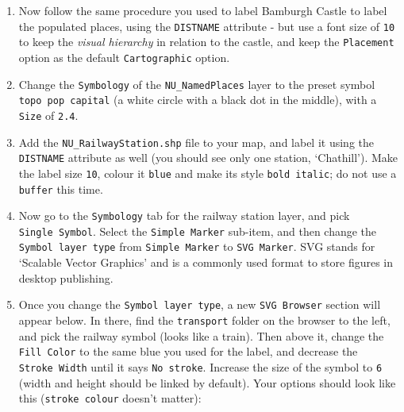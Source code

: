 \documentclass[
  letterpaper,
  DIV=11,
  numbers=noendperiod]{scrreprt}
\begin{document}
\begin{enumerate}
\def\labelenumi{(\arabic{enumi})}
\setcounter{enumi}{232}
\item
  Now follow the same procedure you used to label Bamburgh Castle to
  label the populated places, using the \texttt{DISTNAME} attribute -
  but use a font size of \texttt{10} to keep the \emph{visual hierarchy}
  in relation to the castle, and keep the \texttt{Placement} option as
  the default \texttt{Cartographic} option.
\item
  Change the \texttt{Symbology} of the \texttt{NU\_NamedPlaces} layer to
  the preset symbol \texttt{topo\ pop\ capital} (a white circle with a
  black dot in the middle), with a \texttt{Size} of \texttt{2.4}.
\item
  Add the \texttt{NU\_RailwayStation.shp} file to your map, and label it
  using the \texttt{DISTNAME} attribute as well (you should see only one
  station, `Chathill'). Make the label size \texttt{10}, colour it
  \texttt{blue} and make its style \texttt{bold\ italic}; do not use a
  \texttt{buffer} this time.
\item
  Now go to the \texttt{Symbology} tab for the railway station layer,
  and pick \texttt{Single\ Symbol}. Select the \texttt{Simple\ Marker}
  sub-item, and then change the \texttt{Symbol\ layer\ type} from
  \texttt{Simple\ Marker} to \texttt{SVG\ Marker}. SVG stands for
  `Scalable Vector Graphics' and is a commonly used format to store
  figures in desktop publishing.
\item
  Once you change the \texttt{Symbol\ layer\ type}, a new
  \texttt{SVG\ Browser} section will appear below. In there, find the
  \texttt{transport} folder on the browser to the left, and pick the
  railway symbol (looks like a train). Then above it, change the
  \texttt{Fill\ Color} to the same blue you used for the label, and
  decrease the \texttt{Stroke\ Width} until it says \texttt{No\ stroke}.
  Increase the size of the symbol to \texttt{6} (width and height should
  be linked by default). Your options should look like this
  (\texttt{stroke\ colour} doesn't matter):
\end{enumerate}
\end{document}
